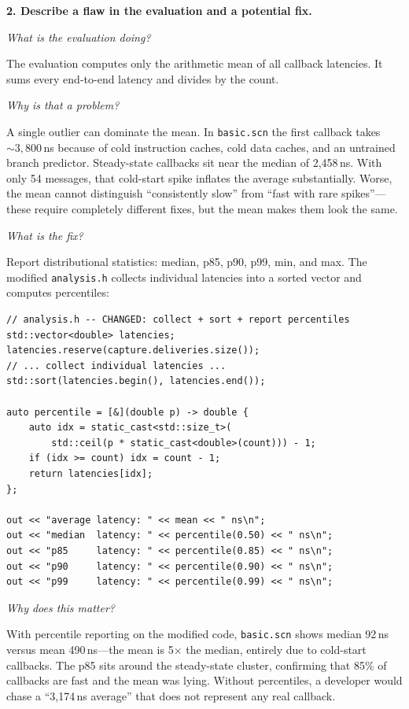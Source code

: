 \documentclass[11pt]{article}
\newcommand{\prompt}[1]{\par\medskip\noindent\textbf{#1}\par\smallskip\noindent\ignorespaces}
\newcommand{\sq}[1]{\par\smallskip\noindent\textit{#1}\par\noindent\ignorespaces}
\begin{document}
\prompt{2. Describe a flaw in the evaluation and a potential fix.}

\sq{What is the evaluation doing?}
The evaluation computes only the arithmetic mean of all callback latencies. It sums every end-to-end latency and divides by the count.

\sq{Why is that a problem?}
A single outlier can dominate the mean. In \texttt{basic.scn} the first callback takes ${\sim}3{,}800$\,ns because of cold instruction caches, cold data caches, and an untrained branch predictor. Steady-state callbacks sit near the median of 2{,}458\,ns. With only 54 messages, that cold-start spike inflates the average substantially. Worse, the mean cannot distinguish ``consistently slow'' from ``fast with rare spikes''---these require completely different fixes, but the mean makes them look the same.

\sq{What is the fix?}
Report distributional statistics: median, p85, p90, p99, min, and max. The modified \texttt{analysis.h} collects individual latencies into a sorted vector and computes percentiles:

\begin{lstlisting}
// analysis.h -- CHANGED: collect + sort + report percentiles
std::vector<double> latencies;
latencies.reserve(capture.deliveries.size());
// ... collect individual latencies ...
std::sort(latencies.begin(), latencies.end());

auto percentile = [&](double p) -> double {
    auto idx = static_cast<std::size_t>(
        std::ceil(p * static_cast<double>(count))) - 1;
    if (idx >= count) idx = count - 1;
    return latencies[idx];
};

out << "average latency: " << mean << " ns\n";
out << "median  latency: " << percentile(0.50) << " ns\n";
out << "p85     latency: " << percentile(0.85) << " ns\n";
out << "p90     latency: " << percentile(0.90) << " ns\n";
out << "p99     latency: " << percentile(0.99) << " ns\n";
\end{lstlisting}

\sq{Why does this matter?}
With percentile reporting on the modified code, \texttt{basic.scn} shows median 92\,ns versus mean 490\,ns---the mean is 5$\times$ the median, entirely due to cold-start callbacks. The p85 sits around the steady-state cluster, confirming that 85\% of callbacks are fast and the mean was lying. Without percentiles, a developer would chase a ``3{,}174\,ns average'' that does not represent any real callback.
\end{document}
